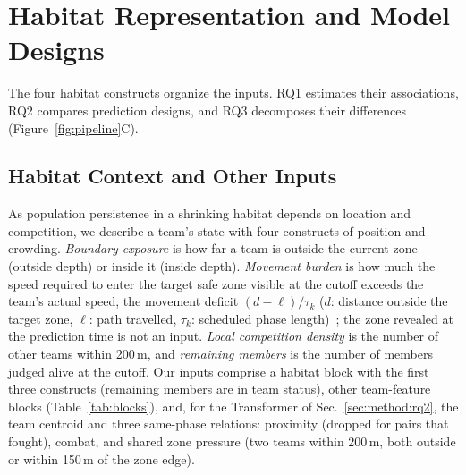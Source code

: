 \documentclass[sigconf,anonymous,nonacm]{acmart}
\begin{document}
\section{Habitat Representation and Model Designs}
\label{sec:method:design}
The four habitat constructs organize the inputs. RQ1 estimates their associations, RQ2 compares prediction designs, and RQ3 decomposes their differences (Figure~\ref{fig:pipeline}C).

\subsection{Habitat Context and Other Inputs}
\label{sec:method:representation}
As population persistence in a shrinking habitat depends on location and competition, we describe a team's state with four constructs of position and crowding.
\emph{Boundary exposure} is how far a team is outside the current zone (outside depth) or inside it (inside depth).
\emph{Movement burden} is how much the speed required to enter the target safe zone visible at the cutoff exceeds the team's actual speed, the movement deficit $(d-\ell)/\tau_k$ ($d$: distance outside the target zone, $\ell$: path travelled, $\tau_k$: scheduled phase length)~\cite{Nathan08}; the zone revealed at the prediction time is not an input.
\emph{Local competition density} is the number of other teams within 200\,m, and \emph{remaining members} is the number of members judged alive at the cutoff.
Our inputs comprise a habitat block with the first three constructs (remaining members are in team status), other team-feature blocks (Table~\ref{tab:blocks}), and, for the Transformer of Sec.~\ref{sec:method:rq2}, the team centroid and three same-phase relations: proximity (dropped for pairs that fought), combat, and shared zone pressure (two teams within 200\,m, both outside or within 150\,m of the zone edge).
\end{document}
